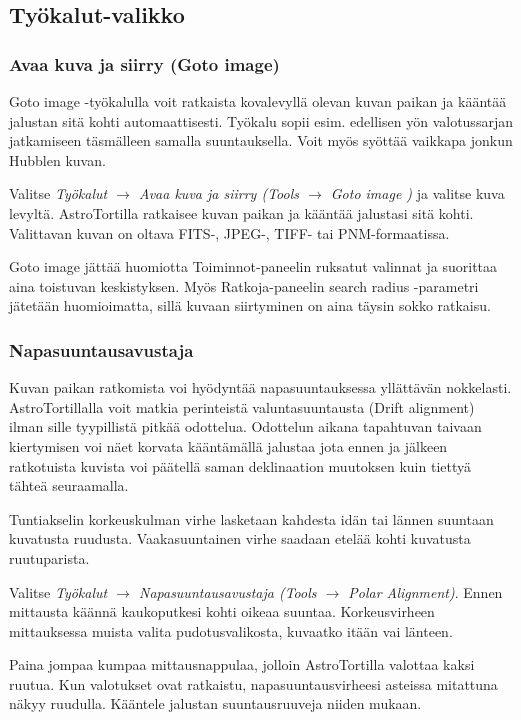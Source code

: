 \documentclass{article}
\begin{document}
\subsection{Työkalut-valikko}

\subsubsection{Avaa kuva ja siirry (Goto image)}

Goto image -työkalulla voit ratkaista kovalevyllä olevan kuvan paikan ja kääntää jalustan sitä kohti automaattisesti.
Työkalu sopii esim. edellisen yön valotussarjan jatkamiseen täsmälleen samalla suuntauksella. Voit myös syöttää vaikkapa jonkun Hubblen kuvan.

Valitse \emph{Työkalut $\rightarrow$ Avaa kuva ja siirry (Tools $\rightarrow$ Goto image )} ja valitse kuva levyltä.
AstroTortilla ratkaisee kuvan paikan ja kääntää jalustasi sitä kohti. Valittavan kuvan on oltava FITS-, JPEG-, TIFF-
tai PNM-formaatissa.

Goto image jättää huomiotta Toiminnot-paneelin ruksatut valinnat ja suorittaa aina toistuvan keskistyksen.
Myös Ratkoja-paneelin search radius -parametri jätetään huomioimatta, sillä kuvaan siirtyminen on aina täysin sokko ratkaisu.

\subsubsection{Napasuuntausavustaja}

Kuvan paikan ratkomista voi hyödyntää napasuuntauksessa yllättävän nokkelasti.
AstroTortillalla voit matkia perinteistä valuntasuuntausta (Drift alignment) 
ilman sille tyypillistä pitkää odottelua. Odottelun aikana tapahtuvan taivaan
kiertymisen voi näet korvata kääntämällä jalustaa jota ennen ja jälkeen ratkotuista 
kuvista voi päätellä saman deklinaation muutoksen kuin tiettyä tähteä seuraamalla.

Tuntiakselin korkeuskulman virhe lasketaan kahdesta idän tai lännen suuntaan kuvatusta ruudusta.
Vaakasuuntainen virhe saadaan etelää kohti kuvatusta ruutuparista.

Valitse \emph{Työkalut $\rightarrow$ Napasuuntausavustaja
(Tools $\rightarrow$ Polar Alignment)}. Ennen mittausta käännä kaukoputkesi 
kohti oikeaa suuntaa.  Korkeusvirheen mittauksessa muista valita pudotusvalikosta, kuvaatko itään vai länteen.

Paina jompaa kumpaa mittausnappulaa, jolloin AstroTortilla
valottaa kaksi ruutua. Kun valotukset ovat ratkaistu, napasuuntausvirheesi
asteissa mitattuna näkyy ruudulla. Kääntele jalustan suuntausruuveja niiden mukaan.
\end{document}

